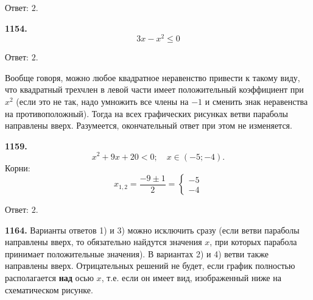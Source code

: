 \null \hspace*{\fill} Ответ: $2$.

\newpage \textbf{1154.} $$3x-x^2\leq0$$

\begin{figure}[h!]
\end{figure}

\null \hspace*{\fill} Ответ: $2$.          

Вообще говоря, можно любое квадратное неравенство привести к такому виду, что квадратный трехчлен в левой части имеет положительный коэффициент при $x^2$ (если это не так, надо умножить все члены на $-1$ и сменить знак неравенства на противоположный). Тогда на всех графических рисунках ветви параболы направлены вверх. Разумеется, окончательный ответ при этом не изменяется.  

\textbf{1159.} $$x^2+9x+20<0;\quad x\in (-5;-4).$$
Корни: $$x_{1,2}=\frac{-9\pm1}{2}=\begin{cases}-5\\-4 \end{cases}$$

\begin{figure}[h!]
\end{figure}

\null \hspace*{\fill} Ответ: $2$.   

\textbf{1164.}  Варианты ответов 1) и 3) можно исключить сразу (если ветви параболы направлены вверх, то обязательно найдутся значения $x$, при которых парабола принимает положительные значения). В вариантах 2) и 4) ветви также направлены вверх. \newpage Отрицательных решений не будет, если график полностью располагается \textbf{над} осью $x$, т.е. если он имеет вид, изображенный ниже на схематическом рисунке. 

\begin{figure}[h!]
\end{figure}

